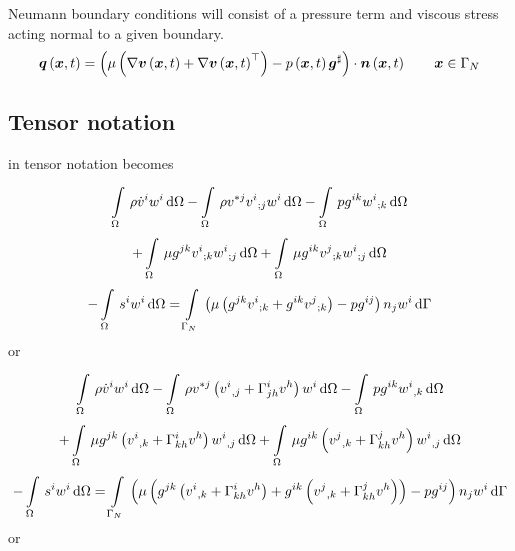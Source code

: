 Neumann boundary conditions will consist of a pressure term and
viscous stress acting normal to a given boundary.
\begin{equation}
  \fnof{\vectr{q}}{\vectr{x},t} =
  \dotprod{\pbrac{\mu\pbrac{\gradient{}{\fnof{\vectr{v}}{\vectr{x},t}}+\transpose{\gradient{}{\fnof{\vectr{v}}{\vectr{x},t}}}}-
      \fnof{p}{\vectr{x},t}\sharptensor{\vectr{g}}}}{\fnof{\vectr{n}}{\vectr{x},t}}  \quad\quad \vectr{x}\in\Gamma_{N}
  \label{eqn:StokesNeumannBC}  
\end{equation}

\subsection{Tensor notation}

 in tensor notation becomes
\begin{multline}
  \gint{\Omega}{}{\rho\dot{v}^{i}w^{i}}{\Omega}
 -\gint{\Omega}{}{\rho v^{*j}\covarderiv{v^{i}}{j}w^{i}}{\Omega}
 -\gint{\Omega}{}{pg^{ik}\covarderiv{w^{i}}{k}}{\Omega}\\
 +\gint{\Omega}{}{{\mu}g^{jk}\covarderiv{v^{i}}{k}\covarderiv{w^{i}}{j}}{\Omega}
 +\gint{\Omega}{}{{\mu}g^{ik}\covarderiv{v^{j}}{k}\covarderiv{w^{i}}{j}}{\Omega}\\
 -\gint{\Omega}{}{s^{i}w^{i}}{\Omega}
 =\gint{\Gamma_N}{}{\pbrac{\mu\pbrac{g^{jk}\covarderiv{v^{i}}{k}+g^{ik}\covarderiv{v^{j}}{k}}-pg^{ij}}n_{j}w^{i}}{\Gamma}
 \label{eqn:TensorStokesEquation}
\end{multline}
or
\begin{multline}
  \gint{\Omega}{}{\rho\dot{v}^{i}w^{i}}{\Omega}
 -\gint{\Omega}{}{\rho v^{*j}\pbrac{\partialderiv{v^{i}}{j}+\christoffel{i}{j}{h}v^{h}}w^{i}}{\Omega}
 -\gint{\Omega}{}{pg^{ik}\partialderiv{w^{i}}{k}}{\Omega}\\
 +\gint{\Omega}{}{{\mu}g^{jk}\pbrac{\partialderiv{v^{i}}{k}+\christoffel{i}{k}{h}v^{h}}\partialderiv{w^{i}}{j}}{\Omega}
 +\gint{\Omega}{}{{\mu}g^{ik}\pbrac{\partialderiv{v^{j}}{k}+\christoffel{j}{k}{h}v^{h}}\partialderiv{w^{i}}{j}}{\Omega}\\
 -\gint{\Omega}{}{s^{i}w^{i}}{\Omega}
 =\gint{\Gamma_N}{}{\pbrac{\mu\pbrac{g^{jk}\pbrac{\partialderiv{v^{i}}{k}+\christoffel{i}{k}{h}v^{h}}+g^{ik}\pbrac{\partialderiv{v^{j}}{k}+\christoffel{j}{k}{h}v^{h}}}-pg^{ij}}n_{j}w^{i}}{\Gamma}
 \label{eqn:Tensor2StokesEquation}
\end{multline}
or

